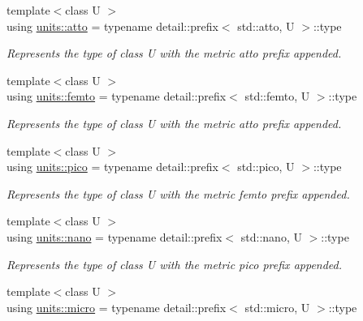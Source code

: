 \begin{DoxyCompactItemize}
\item 
{\footnotesize template$<$class U $>$ }\\using \hyperlink{group___unit_manipulators_ga8a7180c782263384a118dc8ffa5bc689}{units\+::atto} = typename detail\+::prefix$<$ std\+::atto, U $>$\+::type
\begin{DoxyCompactList}\small\item\em Represents the type of {\ttfamily class U} with the metric \textquotesingle{}atto\textquotesingle{} prefix appended. \end{DoxyCompactList}\item 
{\footnotesize template$<$class U $>$ }\\using \hyperlink{group___unit_manipulators_gab3c39c4b3083f6ca59ee0fd0e116f814}{units\+::femto} = typename detail\+::prefix$<$ std\+::femto, U $>$\+::type
\begin{DoxyCompactList}\small\item\em Represents the type of {\ttfamily class U} with the metric \textquotesingle{}atto\textquotesingle{} prefix appended. \end{DoxyCompactList}\item 
{\footnotesize template$<$class U $>$ }\\using \hyperlink{group___unit_manipulators_ga82a8d14a3e0877a375a66b64c45baab9}{units\+::pico} = typename detail\+::prefix$<$ std\+::pico, U $>$\+::type
\begin{DoxyCompactList}\small\item\em Represents the type of {\ttfamily class U} with the metric \textquotesingle{}femto\textquotesingle{} prefix appended. \end{DoxyCompactList}\item 
{\footnotesize template$<$class U $>$ }\\using \hyperlink{group___unit_manipulators_ga1c25c3c1d6c1f3aed3fd1ecf043110d5}{units\+::nano} = typename detail\+::prefix$<$ std\+::nano, U $>$\+::type
\begin{DoxyCompactList}\small\item\em Represents the type of {\ttfamily class U} with the metric \textquotesingle{}pico\textquotesingle{} prefix appended. \end{DoxyCompactList}\item 
{\footnotesize template$<$class U $>$ }\\using \hyperlink{group___unit_manipulators_gaea53c906ec805110b93f02db4a961971}{units\+::micro} = typename detail\+::prefix$<$ std\+::micro, U $>$\+::type

\end{DoxyCompactItemize}
